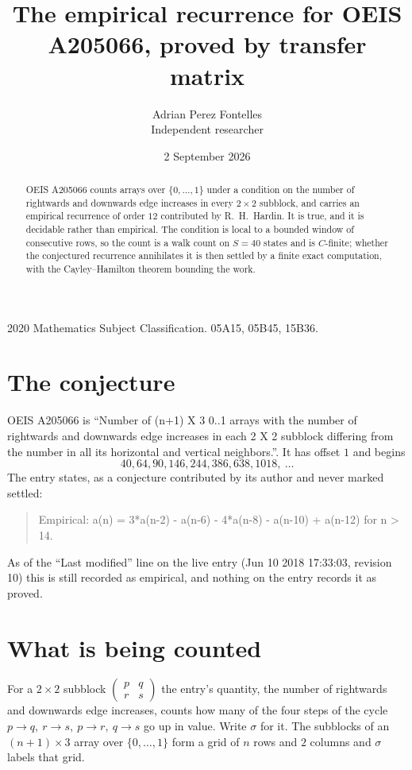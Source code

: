 \documentclass[11pt,a4paper]{article}
\title{The empirical recurrence for OEIS A205066, proved by transfer matrix}
\author{Adrian Perez Fontelles\\ \small Independent researcher}
\date{2 September 2026}
\theoremstyle{plain}
\theoremstyle{definition}
\begin{document}
\maketitle

\begin{abstract}
OEIS A205066 counts arrays over $\{0,\dots,1\}$ under a condition on the number of rightwards and downwards edge increases
in every $2\times2$ subblock, and carries an empirical recurrence of order $12$ contributed by
R.~H.~Hardin. It is true, and it is decidable rather than empirical. The condition is local to
a bounded window of consecutive rows, so the count is a walk count on $S=40$ states and is
$C$-finite; whether the conjectured recurrence annihilates it is then settled by a finite exact
computation, with the Cayley--Hamilton theorem bounding the work.
\end{abstract}

\noindent\small 2020 Mathematics Subject Classification. 05A15, 05B45, 15B36.\normalsize

\section{The conjecture}

OEIS A205066 is ``Number of (n+1) X 3 0..1 arrays with the number of rightwards and downwards edge increases in each 2 X 2 subblock differing from the number in all its horizontal and vertical neighbors.''. It has offset $1$ and begins
\[
40, 64, 90, 146, 244, 386, 638, 1018,\ \dots
\]
The entry states, as a conjecture contributed by its author and never marked settled:
\begin{quote}
Empirical: a(n) = 3*a(n-2) - a(n-6) - 4*a(n-8) - a(n-10) + a(n-12) for n > 14.
\end{quote}
As of the ``Last modified'' line on the live entry (Jun 10 2018 17:33:03, revision 10) this is still
recorded as empirical, and nothing on the entry records it as proved.

\section{What is being counted}

For a $2\times2$ subblock $\begin{pmatrix}p&q\\r&s\end{pmatrix}$ the
entry's quantity, the number of rightwards and downwards edge increases, counts how many of the four steps of the cycle $p\to q,\ r\to s,\ p\to r,\ q\to s$ go up in value. Write $\sigma$ for it. The subblocks of an
$(n+1)\times3$ array over $\{0,\dots,1\}$ form a grid of $n$ rows and $2$
columns and $\sigma$ labels that grid.
\end{document}
